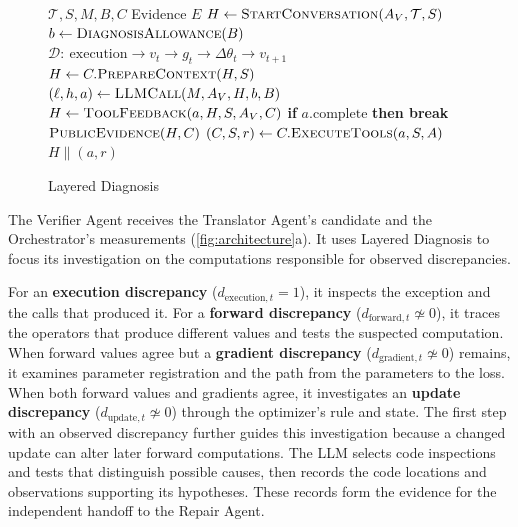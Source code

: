 \documentclass{article}
\begin{document}
{
\setlength{\intextsep}{0pt}
\begin{figure}
\begin{minipage}{\linewidth}
\begin{algorithm}[H]
\caption{Layered Diagnosis}
\label{alg:diagnose}
\raggedright
\small
\begin{algorithmic}[1]
\Require $\mathcal T,S,M,B,C$
\Ensure Evidence $E$
  \State $H\gets\Call{StartConversation}{A_V,\mathcal T,S}$
  \State $b\gets\Call{DiagnosisAllowance}{B}$
  \State $\mathcal D:\ \mathrm{execution}\to v_t\to g_t\to\Delta\theta_t\to v_{t+1}$
    \State $H\gets C.\Call{PrepareContext}{H,S}$
    \State $(\ell,h,a)\gets\Call{LLMCall}{M,A_V,H,b,B}$
    \State $H\gets\Call{ToolFeedback}{a,H,S,A_V,C}$
    \State \textbf{if} $a.\mathrm{complete}$ \textbf{then break}
  \EndWhile
  \State \Return $\Call{PublicEvidence}{H,C}$
\EndFunction
{}
  \State $(C,S,r)\gets C.\Call{ExecuteTools}{a,S,A}$
  \State \Return $H\mathbin{\|}(a,r)$
\EndFunction
\end{algorithmic}
\end{algorithm}
\end{minipage}
\end{figure}
The Verifier Agent receives the Translator Agent's candidate and the Orchestrator's measurements (\cref{fig:architecture}a). It uses Layered Diagnosis to focus its investigation on the computations responsible for observed discrepancies.

For an \textbf{execution discrepancy} ($d_{\mathrm{execution},t}=1$), it inspects the exception and the calls that produced it. For a \textbf{forward discrepancy} ($d_{\mathrm{forward},t}\not\simeq0$), it traces the operators that produce different values and tests the suspected computation. When forward values agree but a \textbf{gradient discrepancy} ($d_{\mathrm{gradient},t}\not\simeq0$) remains, it examines parameter registration and the path from the parameters to the loss. When both forward values and gradients agree, it investigates an \textbf{update discrepancy} ($d_{\mathrm{update},t}\not\simeq0$) through the optimizer's rule and state. The first step with an observed discrepancy further guides this investigation because a changed update can alter later forward computations. The LLM selects code inspections and tests that distinguish possible causes, then records the code locations and observations supporting its hypotheses. These records form the evidence for the independent handoff to the Repair Agent.

}
\end{document}
